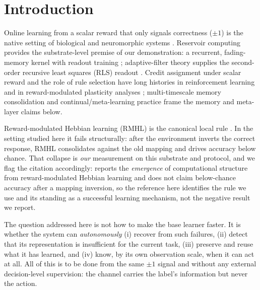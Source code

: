 \documentclass[preprint,12pt]{elsarticle}
\begin{document}
\section{Introduction}
\label{sec:intro}

Online learning from a scalar reward that only signals correctness
($\pm1$) is the native setting of biological and neuromorphic systems
\cite{hoerzer2014,pfister2006}. Reservoir computing provides the
substrate-level premise of our demonstration: a recurrent, fading-memory
kernel with readout training
\cite{jaeger2001,maass2002,lukosevicius2009,verstraeten2007,tanaka2019,
appeltant2011,larger2012,jaeger2004,pathak2018,mackeyglass1977};
adaptive-filter theory supplies the second-order recursive least squares
(RLS) readout
\cite{haykin2002,hoerl1970}. Credit assignment
under scalar reward and the role of rule selection have long histories in
reinforcement learning \cite{zinkevich2003,cesabianchi2006} and in
reward-modulated plasticity analyses \cite{hoerzer2014}; multi-timescale
memory consolidation \cite{fusi2005,benna2016,mcclelland1995} and
continual/meta-learning practice \cite{parisi2019,kirkpatrick2017,
hospedales2022,finn2017} frame the memory and meta-layer claims below.

Reward-modulated Hebbian learning (RMHL) is the canonical local rule
\cite{hoerzer2014}. In the setting studied here it fails structurally: after
the environment inverts the correct response, RMHL consolidates against the
old mapping and drives accuracy below chance. That collapse is \emph{our}
measurement on this substrate and protocol, and we flag the citation
accordingly: \cite{hoerzer2014} reports the \emph{emergence} of computational
structure from reward-modulated Hebbian learning and does not claim
below-chance accuracy after a mapping inversion, so the reference here
identifies the rule we use and its standing as a successful learning mechanism,
not the negative result we report.

The question addressed here is not how to make the base
learner faster. It is whether the system can \emph{autonomously} (i) recover
from such failures, (ii) detect that its representation is insufficient for
the current task, (iii) preserve and reuse what it has learned, and (iv)
know, by its own observation scale, when it can act at all. All of this is to
be done from the same $\pm1$ signal and without any external
decision-level supervision: the channel carries the label's information
but never the action.
\end{document}
